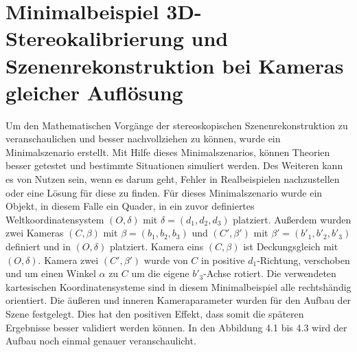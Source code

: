 \chapter{Minimalbeispiel 3D-Stereokalibrierung und Szenenrekonstruktion bei Kameras gleicher Auflösung}
\label{sec:minimal} 

Um den Mathematischen Vorgänge der stereoskopischen Szenenrekonstruktion zu veranschaulichen und besser nachvollziehen zu können, wurde ein Minimalszenario erstellt. Mit Hilfe dieses Minimalszenarios, können Theorien besser getestet und bestimmte Situationen simuliert werden. Des Weiteren kann es von Nutzen sein, wenn es darum geht, Fehler in Realbeispielen nachzustellen oder eine Lösung für diese zu finden. Für dieses Minimalszenario wurde ein Objekt, in diesem Falle ein Quader, in ein zuvor definiertes Weltkoordinatensystem $(O,\delta)$ mit $\delta = (d_1,d_2,d_3)$ platziert. Außerdem wurden zwei Kameras $(C,\beta)$ mit $\beta = (b_1,b_2,b_3)$ und $(C',\beta')$ mit $\beta' = (b'_1,b'_2,b'_3)$ definiert und in $(O,\delta)$ platziert. Kamera eins $(C,\beta)$ ist Deckungsgleich mit $(O,\delta)$. Kamera zwei $(C',\beta')$ wurde von $C$ in positive $d_1$-Richtung, verschoben und um einen Winkel $\alpha$ zu $C$ um die eigene $b'_3$-Achse rotiert. Die verwendeten kartesischen Koordinatensysteme sind in diesem Minimalbeispiel alle rechtshändig orientiert. Die äußeren und inneren Kameraparameter wurden für den Aufbau der Szene festgelegt. Dies hat den positiven Effekt, dass somit die späteren Ergebnisse besser validiert werden können. In den Abbildung 4.1 bis 4.3 wird der Aufbau noch einmal genauer veranschaulicht. \\

